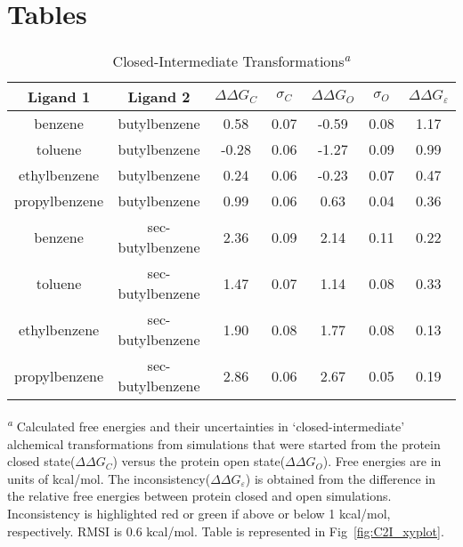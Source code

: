 \section*{Tables}

\begin{table}[!htb]
\centering
\caption{Closed-Intermediate Transformations\textsuperscript{\emph{a}}}
\label{tbl:C-I}
\begin{tabular}{|c|c|c|c|c|c|c|}
\hline
\textbf{Ligand 1}   & \textbf{Ligand 2}    & \boldmath$\Delta\Delta G_{C}$ & \boldmath$\sigma_{C}$ & \boldmath$\Delta\Delta G_{O}$ & \boldmath$\sigma_{O}$ & \boldmath$\Delta\Delta G_{\varepsilon}$            \\ \hline
benzene         & butylbenzene   & 0.58    & 0.07  & -0.59  & 0.08  & \cellcolor[HTML]{FFCCC9}1.17 \\ \hline
toluene         & butylbenzene   & -0.28   & 0.06  & -1.27  & 0.09  & \cellcolor[HTML]{9AFF99}0.99 \\ \hline
ethylbenzene    & butylbenzene   & 0.24    & 0.06  & -0.23  & 0.07  & \cellcolor[HTML]{9AFF99}0.47 \\ \hline
propylbenzene & butylbenzene   & 0.99    & 0.06  & 0.63   & 0.04  & \cellcolor[HTML]{9AFF99}0.36 \\ \hline
benzene         & sec-butylbenzene & 2.36    & 0.09  & 2.14   & 0.11  & \cellcolor[HTML]{9AFF99}0.22 \\ \hline
toluene         & sec-butylbenzene & 1.47    & 0.07  & 1.14   & 0.08  & \cellcolor[HTML]{9AFF99}0.33 \\ \hline
ethylbenzene    & sec-butylbenzene & 1.90    & 0.08  & 1.77   & 0.08  & \cellcolor[HTML]{9AFF99}0.13 \\ \hline
propylbenzene & sec-butylbenzene & 2.86    & 0.06  & 2.67   & 0.05  & \cellcolor[HTML]{9AFF99}0.19 \\ \hline
\end{tabular}

\textsuperscript{\emph{a}} Calculated free energies and their uncertainties in `closed-intermediate' alchemical transformations from simulations that were started from the protein closed state(\boldmath$\Delta\Delta G_{C}$) versus the protein open state(\boldmath$\Delta\Delta G_{O}$).
Free energies are in units of kcal/mol. 
The inconsistency(\boldmath$\Delta\Delta G_{\varepsilon}$) is obtained from the difference in the relative free energies between protein closed and open simulations. 
Inconsistency is highlighted red or green if above or below 1 kcal/mol, respectively.
RMSI is 0.6 kcal/mol.
Table is represented in Fig~\ref{fig:C2I_xyplot}.
\end{table}

